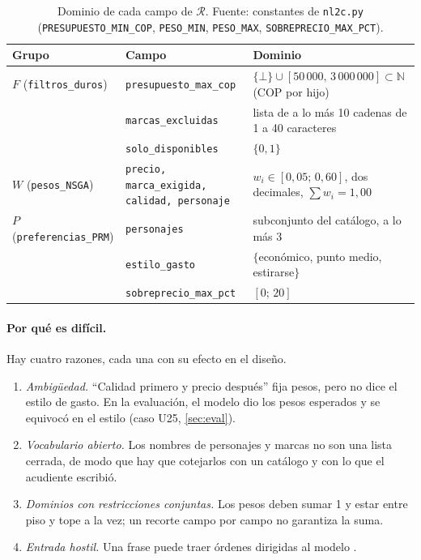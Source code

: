 \documentclass[11pt,letterpaper]{article}
\newcommand{\R}{\mathcal{R}}
\newcommand{\cod}[1]{\texttt{#1}}
\begin{document}
\begin{table}[ht]
\centering\small
\begin{tabular}{@{}L{2.9cm}L{4.6cm}L{5.6cm}@{}}\toprule
Grupo & Campo & Dominio\\\midrule
$F$ (\cod{filtros\_duros}) & \cod{presupuesto\_max\_cop} & $\{\bot\}\cup[50\,000,\,3\,000\,000]\subset\mathbb{N}$ (COP por hijo)\\
 & \cod{marcas\_excluidas} & lista de a lo m\'as 10 cadenas de 1 a 40 caracteres\\
 & \cod{solo\_disponibles} & $\{0,1\}$\\
$W$ (\cod{pesos\_NSGA}) & \cod{precio, marca\_exigida, calidad, personaje} & $w_i\in[0{,}05;\,0{,}60]$, dos decimales, $\sum w_i=1{,}00$\\
$P$ (\cod{preferencias\_PRM}) & \cod{personajes} & subconjunto del cat\'alogo, a lo m\'as 3\\
 & \cod{estilo\_gasto} & $\{$econ\'omico, punto medio, estirarse$\}$\\
 & \cod{sobreprecio\_max\_pct} & $[0;\,20]$\\\bottomrule
\end{tabular}
\caption{Dominio de cada campo de $\R$. Fuente: constantes de \cod{nl2c.py}
(\cod{PRESUPUESTO\_MIN\_COP}, \cod{PESO\_MIN}, \cod{PESO\_MAX}, \cod{SOBREPRECIO\_MAX\_PCT}).}
\label{tab:dominios}
\end{table}

\paragraph{Por qu\'e es dif\'icil.} Hay cuatro razones, cada una con su efecto en el dise\~no.
\begin{enumerate}[label=(\alph*),leftmargin=*]
  \item \emph{Ambig\"uedad.} \enquote{Calidad primero y precio despu\'es} fija pesos, pero no dice el estilo de gasto.
  En la evaluaci\'on, el modelo dio los pesos esperados y se equivoc\'o en el estilo (caso U25, \cref{sec:eval}).
  \item \emph{Vocabulario abierto.} Los nombres de personajes y marcas no son una lista cerrada, de modo que hay
  que cotejarlos con un cat\'alogo y con lo que el acudiente escribi\'o.
  \item \emph{Dominios con restricciones conjuntas.} Los pesos deben sumar 1 y estar entre piso y tope a la vez;
  un recorte campo por campo no garantiza la suma.
  \item \emph{Entrada hostil.} Una frase puede traer \'ordenes dirigidas al modelo \citep{greshake2023indirect}.
\end{enumerate}
\end{document}
